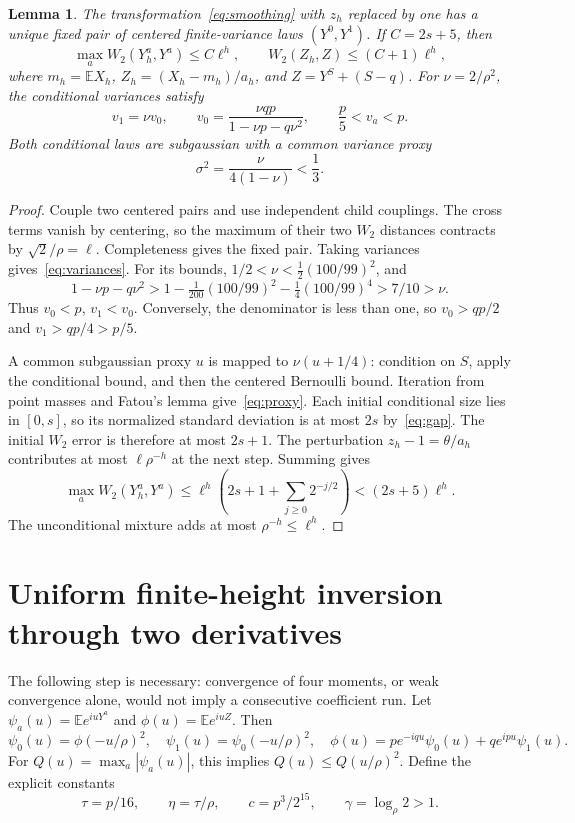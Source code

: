 \documentclass[11pt]{article}
\newtheorem{lemma}[theorem]{Lemma}
\newcommand{\E}{\mathbb E}
\begin{document}
\begin{lemma}\label{lem:fixed}
The transformation~\eqref{eq:smoothing} with $z_h$ replaced by one
has a unique fixed pair of centered finite-variance laws $(Y^0,Y^1)$.
If $C=2s+5$, then
\begin{equation}\label{eq:w2}
 \max_a W_2(Y_h^a,Y^a)\le C\ell^h,\qquad
 W_2(Z_h,Z)\le(C+1)\ell^h,
\end{equation}
where $m_h=\E X_h$, $Z_h=(X_h-m_h)/a_h$, and
$Z=Y^S+(S-q)$.
For $\nu=2/\rho^2$, the conditional variances satisfy
\begin{equation}\label{eq:variances}
 v_1=\nu v_0,\qquad
 v_0=\frac{\nu qp}{1-\nu p-q\nu^2},\qquad
 \frac p5<v_a<p.
\end{equation}
Both conditional laws are subgaussian with a common variance proxy
\begin{equation}\label{eq:proxy}
 \sigma^2=\frac{\nu}{4(1-\nu)}<\frac13.
\end{equation}
\end{lemma}
\begin{proof}
Couple two centered pairs and use independent child couplings. The
cross terms vanish by centering, so the maximum of their two $W_2$
distances contracts by $\sqrt2/\rho=\ell$. Completeness gives the
fixed pair. Taking variances gives~\eqref{eq:variances}. For its bounds,
$1/2<\nu<\tfrac12(100/99)^2$, and
\[
 1-\nu p-q\nu^2>
 1-\tfrac1{200}(100/99)^2-\tfrac14(100/99)^4>7/10>\nu.
\]
Thus $v_0<p$, $v_1<v_0$. Conversely, the denominator is less than
one, so $v_0>qp/2$ and $v_1>qp/4>p/5$.

A common subgaussian proxy $u$ is mapped to $\nu(u+1/4)$: condition
on $S$, apply the conditional bound, and then the centered Bernoulli
bound. Iteration from point masses and Fatou's lemma give~\eqref{eq:proxy}.
Each initial conditional size lies in $[0,s]$, so its normalized standard
deviation is at most $2s$ by~\eqref{eq:gap}. The initial $W_2$ error
is therefore at most $2s+1$. The perturbation $z_h-1=\theta/a_h$
contributes at most $\ell\rho^{-h}$ at the next step. Summing gives
\[
 \max_a W_2(Y_h^a,Y^a)
 \le\ell^h\left(2s+1+\sum_{j\ge0}2^{-j/2}\right)
 <(2s+5)\ell^h.
\]
The unconditional mixture adds at most $\rho^{-h}\le\ell^h$.
\end{proof}

\section{Uniform finite-height inversion through two derivatives}
The following step is necessary: convergence of four moments, or weak
convergence alone, would not imply a consecutive coefficient run.
Let $\psi_a(u)=\E e^{iuY^a}$ and $\phi(u)=\E e^{iuZ}$. Then
\begin{equation}\label{eq:CF}
 \psi_0(u)=\phi(-u/\rho)^2,\quad
 \psi_1(u)=\psi_0(-u/\rho)^2,\quad
 \phi(u)=p e^{-iqu}\psi_0(u)+q e^{ipu}\psi_1(u).
\end{equation}
For $Q(u)=\max_a|\psi_a(u)|$, this implies $Q(u)\le Q(u/\rho)^2$.
Define the explicit constants
\begin{equation}\label{eq:annulus-general}
 \tau=p/16,\qquad \eta=\tau/\rho,\qquad
 c=p^3/2^{15},\qquad \gamma=\log_\rho2>1.
\end{equation}
\end{document}
